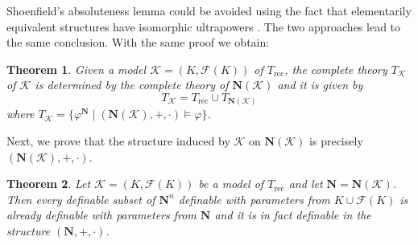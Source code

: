 \documentclass{amsart}
\newcommand{\ca}{\mathcal}
\theoremstyle{plain}
\newtheorem{thm}{Theorem}[section]
\theoremstyle{definition}
\newcommand{\F}{\mathcal{F}}
\newcommand{\hn}{\mathbf N}
\begin{document}
Shoenfield's absoluteness lemma could be avoided using the fact that elementarily equivalent structures have isomorphic ultrapowers \cite{Shelah}. The two approaches lead to the same conclusion. 
With the same proof we obtain: 

\begin{thm}\label{thm:completeness-mod-peano}
Given a model $\ca K = (K, \F(K))$ of $T_{\text{rec}}$, the complete theory $T_{\ca K}$ of $\ca K$ is determined by the complete theory of $\hn (\ca K)$ and it is given by
$$T_{\ca K} = T_{\text{rec}} \cup T_{\hn(\ca K)}$$ 
where $T_{\ca K} = \{\varphi^{\hn} \mid (\hn(\ca K),+,\cdot) \models \varphi\}$. 
\end{thm}

Next, we prove that the structure induced by $\ca K$ on $\hn(\ca K)$ is precisely $(\hn (\ca K), +, \cdot)$. 


\begin{thm} \label{thm:stable-emebeddedness}
	Let $\ca K = (K, \F(K))$ be a model of $T_{\text{rec}}$ and let $\hn = \hn(\ca K)$. Then every 
definable subset of $\hn^n$ definable with parameters from $K \cup \F(K)$ is already definable with parameters from $\hn$ and it is in fact definable in the structure  $(\hn, +,\cdot)$. 
\end{thm}
\end{document}
